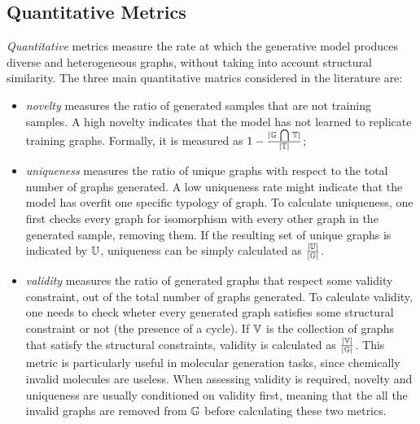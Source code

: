 \subsection{Quantitative Metrics}
\emph{Quantitative} metrics measure the rate at which the generative model produces diverse and heterogeneous graphs, without taking into account structural similarity. The three main quantitative matrics considered in the literature are:
\begin{itemize}
    \item \emph{novelty} measures the ratio of generated samples that are not training samples. A high novelty indicates that the model has not learned to replicate training graphs. Formally, it is measured as $1 - \frac{|\mathbb{G} \,\bigcap\limits\, \mathbb{T}|}{|\mathbb{T}|}$;
    \item \emph{uniqueness} measures the ratio of unique graphs with respect to the total number of graphs generated. A low uniqueness rate might indicate that the model has overfit one specific typology of graph. To calculate uniqueness, one first checks every graph for isomorphism with every other graph in the generated sample, removing them. If the resulting set of unique graphs is indicated by $\mathbb{U}$, uniqueness can be simply calculated as $\frac{|\mathbb{U}|}{|\mathbb{G}|}$.
    \item \emph{validity} measures the ratio of generated graphs that respect some validity constraint, out of the total number of graphs generated. To calculate validity, one needs to check wheter every generated graph satisfies some structural constraint or not (\eg the presence of a cycle). If $\mathbb{V}$ is the collection of graphs that satisfy the structural constraints, validity is calculated as $\frac{|\mathbb{V}|}{|\mathbb{G}|}$. This metric is particularly useful in molecular generation tasks, since chemically invalid molecules are useless. When assessing validity is required, novelty and uniqueness are usually conditioned on validity first, meaning that the all the invalid graphs are removed from $\mathbb{G}$ before calculating these two metrics.
\end{itemize}

